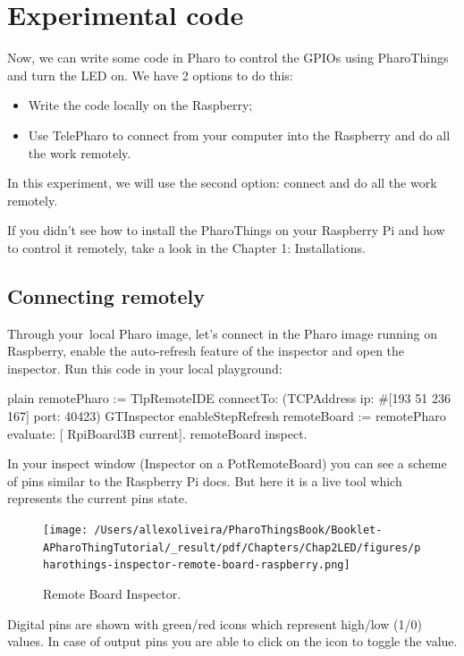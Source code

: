 \documentclass[10pt,twoside,english]{_support/latex/sbabook/sbabook}
\begin{document}
\section{Experimental code}


Now, we can write some code in Pharo to control the GPIOs using PharoThings and turn the LED on. We have 2 options to do this:

\begin{itemize}
\item Write the code locally on the Raspberry;
\item Use TelePharo to connect from your computer into the Raspberry and do all the work remotely.
\end{itemize}

In this experiment, we will use the second option: connect and do all the work remotely. 

If you didn’t see how to install the PharoThings on your Raspberry Pi and how to control it remotely, take a look in the Chapter 1: Installations.
\subsection{Connecting remotely}
Through your local Pharo image, let's connect in the Pharo image running on Raspberry, enable the auto-refresh feature of the inspector and open the inspector. Run this code in your local playground:

\begin{displaycode}{plain}
remotePharo := TlpRemoteIDE connectTo: (TCPAddress ip: #[193 51 236 167] port: 40423)
GTInspector enableStepRefresh
remoteBoard := remotePharo evaluate: [ RpiBoard3B current].
remoteBoard inspect.
\end{displaycode}

In your inspect window (Inspector on a PotRemoteBoard) you can see a scheme of pins similar to the Raspberry Pi docs. But here it is a live tool which represents the current pins state.


\begin{figure}

\begin{center}
\texttt{[image: /Users/allexoliveira/PharoThingsBook/Booklet-APharoThingTutorial/\_result/pdf/Chapters/Chap2LED/figures/pharothings-inspector-remote-board-raspberry.png]}\caption{Remote Board Inspector.\label{remoteBoard}}\end{center}
\end{figure}


Digital pins are shown with green/red icons which represent high/low (1/0) values. In case of output pins you are able to click on the icon to toggle the value.
\end{document}
